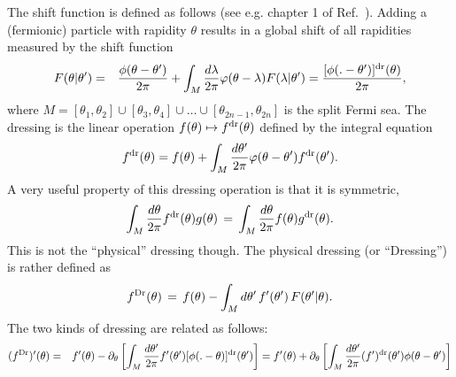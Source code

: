 \documentclass[twocolumn,amsfonts,showpacs,superscriptaddress]{revtex4-1}
\begin{document}
\begin{widetext}
The shift function is defined as follows (see e.g. chapter 1 of Ref.~\cite{korepin1997quantum}). Adding a (fermionic) particle with rapidity $\theta$ results in a global shift of all rapidities measured by the shift function
\begin{eqnarray}
	\label{sm:eq:shift}	
F(\theta | \theta') &=& \frac{\phi(\theta-\theta')}{2\pi} + \int_M \frac{d\lambda}{2\pi} \varphi(\theta-\lambda) F(\lambda | \theta') 
=	\frac{[\phi(.-\theta')]^{\rm dr} (\theta)}{2\pi} ,
\end{eqnarray}
where $M = [\theta_1,\theta_2] \cup [\theta_3,\theta_4] \cup \dots \cup [\theta_{2n-1},\theta_{2n}]$ is the split Fermi sea. The dressing is the linear operation $f(\theta) \mapsto f^{\rm dr}(\theta)$ defined by the integral equation
\begin{equation}
	\label{sm:eq:dr}
	f^{\rm dr} (\theta) = f(\theta) + \int_M \frac{d\theta'}{2\pi} \varphi(\theta-\theta') f^{\rm dr}(\theta') .
\end{equation}
A very useful property of this dressing operation is that it is symmetric,
\begin{equation}
	\int_M \frac{d\theta}{2\pi} f^{\rm dr} (\theta) g(\theta) \, = \, \int_M \frac{d\theta}{2\pi} f (\theta) g^{\rm dr}(\theta) .
\end{equation}
This is not the ``physical'' dressing though. The physical dressing (or ``Dressing'') is rather defined as
\begin{equation}
	\label{sm:eq:Dressing}
	f^{\rm Dr} (\theta) \, = \, f(\theta) - \int_M d \theta' \, f'(\theta')  \, F(\theta' | \theta) .
\end{equation}
The two kinds of dressing are related as follows:
\begin{eqnarray}
	\label{sm:eq:drDr}
\nonumber	( f^{\rm Dr} )' (\theta) & = & f'(\theta) - \partial_\theta \left[ \int_M \frac{d\theta'}{2\pi} f'(\theta')  [\phi(.- \theta)]^{\rm dr}(\theta') \right] 
=f'(\theta)+  \partial_\theta \left[ \int_M \frac{d\theta'}{2\pi} (f')^{\rm dr}(\theta')  \phi( \theta- \theta') \right] \\

\end{eqnarray}
\end{widetext}
\end{document}
